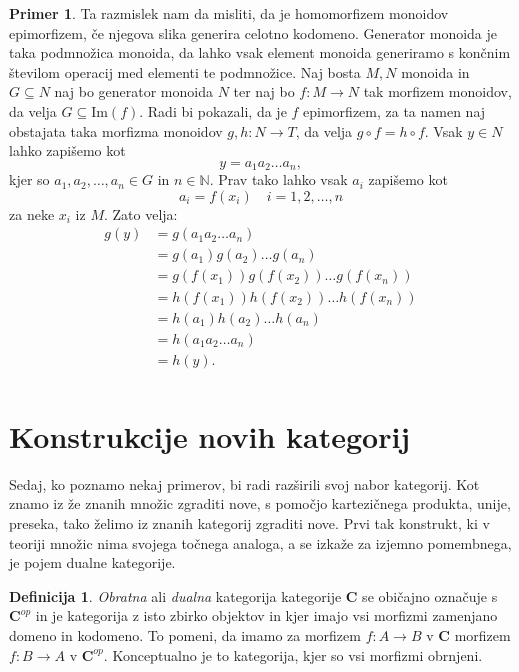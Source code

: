 \documentclass[12pt,a4paper]{book}
\theoremstyle{definition}
\newtheorem{definicija}{Definicija}[chapter]
\theoremstyle{plain}
\theoremstyle{definition}
\newtheorem{primer}{Primer}[section]
\theoremstyle{remark}
\newcommand{\cat}[1]{\textbf{#1}}
\begin{document}
\begin{primer}
Ta razmislek nam da misliti, da je homomorfizem monoidov epimorfizem, če njegova slika generira celotno kodomeno. Generator monoida je taka podmnožica monoida, da lahko vsak element monoida generiramo s končnim številom operacij med elementi te podmnožice. Naj bosta $M,N$ monoida in $G \subseteq N$ naj bo generator monoida $N$ ter naj bo $f: M \to N$ tak morfizem monoidov, da velja $G \subseteq \mathrm{Im}(f)$. Radi bi pokazali, da je $f$ epimorfizem, za ta namen naj obstajata taka morfizma monoidov $g,h: N \to T$, da velja $g \circ f = h \circ f$. Vsak $y \in N$ lahko zapišemo kot 
$$y = a_1 a_2 \ldots a_n,$$
kjer so $a_1,a_2,\ldots,a_n \in G$ in $n \in \mathbb{N}$. Prav tako lahko  vsak $a_i$ zapišemo kot
$$a_i = f(x_i) \quad i=1,2,\ldots,n$$
za neke $x_i$ iz $M$. Zato velja:
\begin{align*}
g(y) &= g(a_1 a_2 \ldots a_n) \\
&= g(a_1) g(a_2) \ldots g(a_n) \\
&= g(f(x_1)) g(f(x_2)) \ldots g(f(x_n)) \\
&= h(f(x_1)) h(f(x_2)) \ldots h(f(x_n)) \\
&= h(a_1) h(a_2) \ldots h(a_n) \\
&= h(a_1 a_2 \ldots a_n) \\
&= h(y). \\
\end{align*}


\end{primer}


\section{Konstrukcije novih kategorij}

Sedaj, ko poznamo nekaj primerov, bi radi razširili svoj nabor kategorij. Kot znamo iz že znanih množic zgraditi nove, s pomočjo kartezičnega produkta, unije, preseka, tako želimo iz znanih kategorij zgraditi nove. Prvi tak konstrukt, ki v teoriji množic nima svojega točnega analoga, a se izkaže za izjemno pomembnega, je pojem dualne kategorije.


\begin{definicija}

\emph{Obratna} ali \emph{dualna} kategorija kategorije $\cat{C}$ se običajno označuje s $\cat{C}^{op}$ in je kategorija z isto zbirko objektov in kjer imajo vsi morfizmi zamenjano domeno in kodomeno. 
To pomeni, da imamo za morfizem $f : A \to B$ v $\cat{C}$ morfizem $f : B \to A$ v $\cat{C}^{op}$. Konceptualno je to kategorija, kjer so vsi morfizmi obrnjeni.
\end{definicija}
\end{document}
